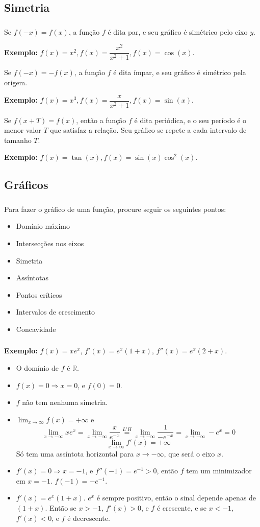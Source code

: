 \documentclass[10 pt]{beamer}
\newcommand{\myframe}[1]{
\begin{frame}
 \frametitle{\insertsection \qquad {\small \insertsubsection}}
#1
\end{frame}}
\newcommand{\spc}{\vspace{0.5 cm}}
\newcommand{\limx}[1]{\lim_{x\rightarrow{#1}}}
\begin{document}
\subsection{Simetria}

\myframe {
  Se $f(-x) = f(x)$, a função $f$ é dita par, e seu gráfico é simétrico
  pelo eixo $y$.
  
  {\bf Exemplo:} $f(x) = x^2, f(x) = \dfrac{x^2}{x^2 + 1}, f(x) = \cos(x)$.
  \spc

  Se $f(-x) = -f(x)$, a função $f$ é dita ímpar, e seu gráfico é simétrico
  pela origem.

  {\bf Exemplo:} $f(x) = x^3, f(x) = \dfrac{x}{x^2 + 1}, f(x) = \sin(x)$.
  \spc

  Se $f(x+T) = f(x)$, então a função $f$ é dita periódica, e o seu
  período é o menor valor $T$ que satisfaz a relação.
  Seu gráfico se repete a cada intervalo de tamanho $T$.

  {\bf Exemplo:} $f(x) = \tan(x), f(x) = \sin(x)\cos^2(x)$.
}

\subsection{Gráficos}

\myframe {
  Para fazer o gráfico de uma função, procure seguir os seguintes pontos:
  \begin{itemize}
    \item Domínio máximo
    \item Intersecções nos eixos
    \item Simetria
    \item Assíntotas
    \item Pontos críticos
    \item Intervalos de crescimento
    \item Concavidade
  \end{itemize}
}

\myframe {
  {\bf Exemplo: } $f(x) = xe^x$, $f'(x) = e^x(1+x)$, $f''(x) = e^x(2+x)$.
  \begin{itemize}
    \item O domínio de $f$ é $\mathbb{R}$.
    \item $f(x) = 0 \Rightarrow x = 0$, e $f(0) = 0$.
    \item $f$ não tem nenhuma simetria.
    \item $\displaystyle \limx{\infty}f(x) = +\infty$ e
      $$ \displaystyle \limx{-\infty}xe^x =
        \limx{-\infty}\frac{x}{e^{-x}} \overset{L'H}{=}
        \limx{-\infty}\frac{1}{-e^{-x}} =
        \limx{-\infty}-e^x = 0 $$
     $$ \limx{\infty} f'(x) = +\infty $$
     Só tem uma assíntota horizontal para $x\rightarrow-\infty$, que
      será o eixo $x$.
    \item $f'(x) = 0 \Rightarrow x = -1$, e $f''(-1) = e^{-1} > 0$, então
      $f$ tem um minimizador em $x=-1$. $f(-1) = -e^{-1}$.
    \item $f'(x) = e^x(1+x)$. $e^x$ é sempre positivo, então o sinal depende
      apenas de $(1+x)$. Então se $x > -1$, $f'(x) > 0$, e $f$ é crescente,
      e se $x < -1$, $f'(x) < 0$, e $f$ é decrescente.
  \end{itemize}
}
\end{document}
